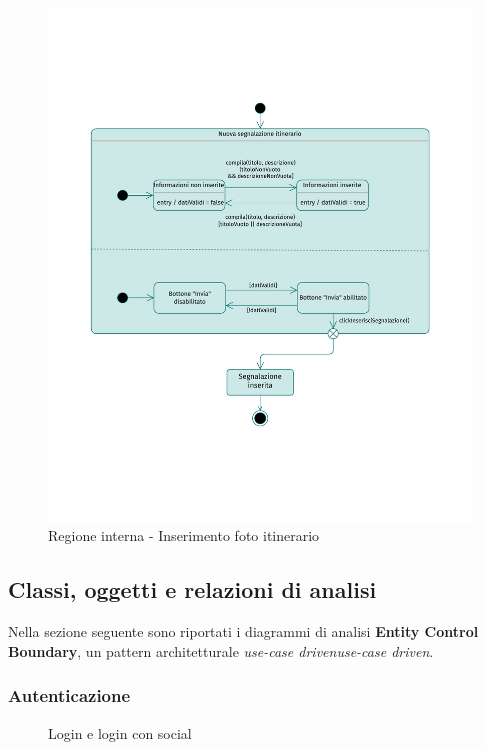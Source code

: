 \documentclass{natourDoc}
\begin{document}
\newpage
\begin{figure}[!htbp]
	\centering
	\includegraphics[width=\textwidth, page=5]{./diagrams/statechart.pdf}
	\caption{Regione interna - Inserimento foto itinerario}
\end{figure}
\FloatBarrier

\newpage
\subsection{Classi, oggetti e relazioni di analisi}
Nella sezione seguente sono riportati i diagrammi di analisi \textbf{Entity Control Boundary}, un pattern architetturale \textit{use-case driven\Gls{use-case driven}}.

\subsubsection{Autenticazione}
\begin{figure}[!htbp]
	\centering
	
	\caption{Login e login con social}
\end{figure}
\FloatBarrier
\end{document}
